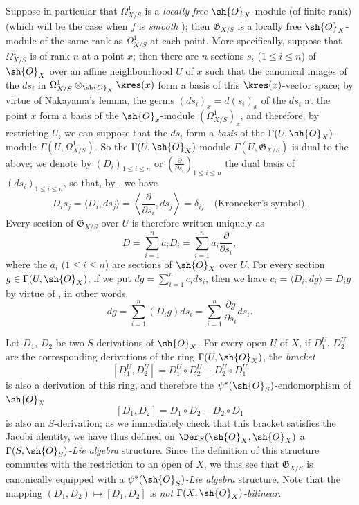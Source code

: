 \begin{env}[16.5.8]
\label{IV.16.5.8}
Suppose in particular that $\Omega_{X/S}^1$ is a \emph{locally free} $\sh{O}_X$-module (of finite rank) (which will be the case when $f$ is \emph{smooth} );
then $\mathfrak{G}_{X/S}$ is a locally free $\sh{O}_X$-module of the same rank as $\Omega_{X/S}^1$ at each point.
More specifically, suppose that $\Omega_{X/S}^1$ is of rank $n$ at a point $x$;
then there are $n$ sections $s_i$ ($1 \leq i \leq n$) of $\sh{O}_X$ over an affine neighbourhood $U$ of $x$ such that the canonical images of the $ds_i$ in $\Omega_{X/S}^1 \otimes_{\sh{O}_X} \kres(x)$ form a basis of this $\kres(x)$-vector space;
by virtue of Nakayama's lemma, the germs $(ds_i)_x = d(s_i)_x$ of the $ds_i$ at the point $x$ form a basis of the $\sh{O}_x$-module $(\Omega_{X/S}^1)_x$, and therefore, by restricting $U$, we can suppose that the $ds_i$ form a \emph{basis} of the $\Gamma(U, \sh{O}_X)$-module $\Gamma(U, \Omega_{X/S}^1)$.
So the $\Gamma(U, \sh{O}_X)$-module $\Gamma(U, \mathfrak{G}_{X/S})$ is dual to the above;
we denote by $(D_i)_{1 \leq i \leq n}$ or $\left(\frac{\partial}{\partial s_i}\right)_{1 \leq i \leq n}$ the dual basis of $(ds_i)_{1 \leq i \leq n}$, so that, by , we have
\[
\label{IV.16.5.8.1}
  D_i s_j = \langle D_i, ds_j \rangle = \left\langle \frac{\partial}{\partial s_i}, ds_j \right\rangle = \delta_{ij} \quad \text{(Kronecker's symbol)}.
  \tag{16.5.8.1}
\]
Every section of $\mathfrak{G}_{X/S}$ over $U$ is therefore written uniquely as
\[
  D = \sum_{i = 1}^n a_i D_i = \sum_{i = 1}^n a_i \frac{\partial}{\partial s_i},
\] 
where the $a_i$ ($1 \leq i \leq n$) are sections of $\sh{O}_X$ over $U$.
For every section $g \in \Gamma(U, \sh{O}_X)$, if we put $dg = \sum_{i = 1}^n c_i ds_i$, then we have $c_i = \langle D_i, dg \rangle = D_i g$ by virtue of , in other words,
\[
\label{IV.16.5.8.2}
  dg = \sum_{i = 1}^n (D_i g) ds_i = \sum_{i = 1}^n \frac{\partial g}{\partial s_i} ds_i.
  \tag{16.5.8.2}
\]
\end{env}

\begin{env}[16.5.9]
\label{IV.16.5.9}
Let $D_1$, $D_2$ be two $S$-derivations of $\sh{O}_X$. 
For every open $U$ of $X$, if $D_1^U$, $D_2^U$ are the corresponding derivations of the ring $\Gamma(U, \sh{O}_X)$, the \emph{bracket}
\[
  [D_1^U, D_2^U] = D_1^U \circ D_2^U - D_2^U \circ D_1^U
\]
is also a derivation of this ring, and therefore the $\psi^*(\sh{O}_S)$-endomorphism of $\sh{O}_X$
\[
\label{IV.16.5.9.1}
  [D_1, D_2] = D_1 \circ D_2 - D_2 \circ D_1
  \tag{16.5.9.1}
\]
is also an $S$-derivation;
as we immediately check that this bracket satisfies the Jacobi identity, we have thus defined on $\Der_S(\sh{O}_X, \sh{O}_X)$ a \emph{$\Gamma(S, \sh{O}_S)$-Lie algebra} structure.
Since the definition of this structure commutes with the restriction to an open of $X$, we thus see that $\mathfrak{G}_{X/S}$ is canonically equipped with a \emph{ $\psi^*(\sh{O}_S)$-Lie algebra} structure.
Note that the mapping $(D_1, D_2) \mapsto [D_1, D_2]$ is \emph{not $\Gamma(X, \sh{O}_X)$-bilinear}.
\end{env} 

